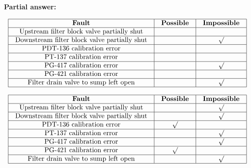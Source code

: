 





\noindent
{\bf Partial answer:}


$$\vbox{\offinterlineskip
\halign{\strut
\vrule \quad\hfil # \ \hfil & 
\vrule \quad\hfil # \ \hfil & 
\vrule \quad\hfil # \ \hfil \vrule \cr
\noalign{\hrule}
%
{\bf Fault} & {\bf Possible} & {\bf Impossible} \cr
%
\noalign{\hrule}
%
Upstream filter block valve partially shut &  &  \cr
%
\noalign{\hrule}
%
Downstream filter block valve partially shut &  & $\surd$ \cr
%
\noalign{\hrule}
%
PDT-136 calibration error &  &  \cr
%
\noalign{\hrule}
%
PT-137 calibration error &  &  \cr
%
\noalign{\hrule}
%
PG-417 calibration error &  & $\surd$ \cr
%
\noalign{\hrule}
%
PG-421 calibration error &  & \cr
%
\noalign{\hrule}
%
Filter drain valve to sump left open &  & $\surd$ \cr
%
\noalign{\hrule}
} %
}$$ %









$$\vbox{\offinterlineskip
\halign{\strut
\vrule \quad\hfil # \ \hfil & 
\vrule \quad\hfil # \ \hfil & 
\vrule \quad\hfil # \ \hfil \vrule \cr
\noalign{\hrule}
%
{\bf Fault} & {\bf Possible} & {\bf Impossible} \cr
%
\noalign{\hrule}
%
Upstream filter block valve partially shut &  & $\surd$ \cr
%
\noalign{\hrule}
%
Downstream filter block valve partially shut &  & $\surd$ \cr
%
\noalign{\hrule}
%
PDT-136 calibration error & $\surd$ &  \cr
%
\noalign{\hrule}
%
PT-137 calibration error &  & $\surd$ \cr
%
\noalign{\hrule}
%
PG-417 calibration error &  & $\surd$ \cr
%
\noalign{\hrule}
%
PG-421 calibration error & $\surd$ & \cr
%
\noalign{\hrule}
%
Filter drain valve to sump left open &  & $\surd$ \cr
%
\noalign{\hrule}
} %
}$$ %






